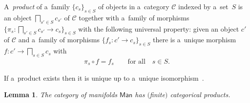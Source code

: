 \documentclass[10pt,a4paper]{amsart}
\numberwithin{equation}{section}
\newtheorem{Lemma}[Theorem]{Lemma}
\begin{document}
\begin{Definition}
A~{\it product} of a~family $\{c_s\}_{s\in S}$ of objects in a~category $\mathscr{C}$ indexed by a~set~$S$ is an object
$\bigsqcap_{s'\in S}c_{s'}$ of $\mathscr{C}$ together with a~family of morphisms $\{\pi_s\colon \bigsqcap_{s'\in
S}c_{s'} \to c_s\}_{s\in S}$ with the following universal property: given an object $c'$ of $\mathscr{C}$ and a~family
of morphisms $\{f_s\colon c'\to c_s\}_{s\in S}$ there is a~unique morphism $f\colon c'\to \bigsqcap_{s\in S}c_s$ with
\begin{gather*}
\pi_s \circ f = f_s
\qquad
\text{for all}
\quad
s\in S.
\end{gather*}
\end{Definition}

\begin{Remark}
If a~product exists then it is unique up to a~unique isomorphism~\cite{Awodey}.
\end{Remark}

\begin{Lemma}
The category of manifolds $\mathsf{Man}$ has $($finite$)$ categorical products.
\label{empt:cat-prod}
\end{Lemma}
\end{document}
